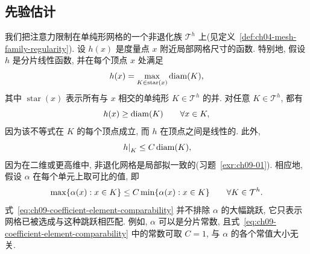 \subsection{先验估计}
\label{sec:ch09-apriori-estimates}
\setcounter{thmcount}{0}
\setcounter{equation}{0}

我们把注意力限制在单纯形网格的一个非退化族 $\mathcal T^h$ 上(见定义~\ref{def:ch04-mesh-family-regularity}). 设 $h(x)$ 是度量点 $x$ 附近局部网格尺寸的函数. 特别地, 假设 $h$ 是分片线性函数, 并在每个顶点 $x$ 处满足
\begin{equation}
\MathBookFormulaID{formula-ch09-local-mesh-size-definition}
\label{eq:ch09-local-mesh-size-definition}
h(x)=\max_{K\in\operatorname{star}(x)}\operatorname{diam}(K),
\end{equation}
其中 $\operatorname{star}(x)$ 表示所有与 $x$ 相交的单纯形 $K\in\mathcal T^h$ 的并. 对任意 $K\in\mathcal T^h$, 都有
\begin{equation}
\MathBookFormulaID{formula-ch09-mesh-size-lower-bound}
\label{eq:ch09-mesh-size-lower-bound}
h(x)\geq\operatorname{diam}(K)
\qquad\forall x\in K,
\end{equation}
因为该不等式在 $K$ 的每个顶点成立, 而 $h$ 在顶点之间是线性的. 此外,
\begin{equation}
\MathBookFormulaID{formula-ch09-element-mesh-size-comparability}
\label{eq:ch09-element-mesh-size-comparability}
\left.h\right|_K\leq C\operatorname{diam}(K),
\end{equation}
因为在二维或更高维中, 非退化网格是局部拟一致的(习题~\ref{exr:ch09-01}). 相应地, 假设 $\alpha$ 在每个单元上取可比的值, 即
\begin{equation}
\MathBookFormulaID{formula-ch09-coefficient-element-comparability}
\label{eq:ch09-coefficient-element-comparability}
\max\{\alpha(x):x\in K\}\leq C\min\{\alpha(x):x\in K\}
\qquad\forall K\in\mathcal T^h.
\end{equation}
式~\eqref{eq:ch09-coefficient-element-comparability} 并不排除 $\alpha$ 的大幅跳跃, 它只表示网格已被选成与这种跳跃相匹配. 例如, $\alpha$ 可以是分片常数, 且式~\eqref{eq:ch09-coefficient-element-comparability} 中的常数可取 $C=1$, 与 $\alpha$ 的各个常值大小无关.

